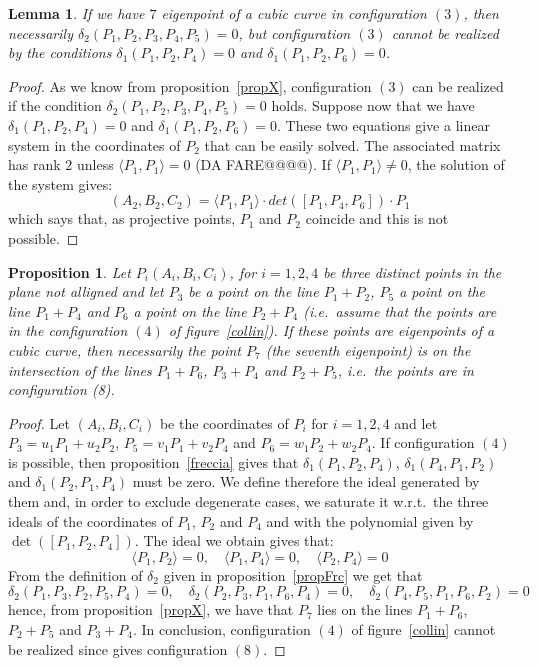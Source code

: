 \documentclass{amsart}
\theoremstyle{plain}
\newtheorem{prop}[theorem]{Proposition}
\newtheorem{lemma}[theorem]{Lemma}
\theoremstyle{definition}
\newcommand{\scl}[2]{\langle #1, #2 \rangle}
\begin{document}
\begin{lemma} If we have $7$ eigenpoint of a cubic curve in configuration
  $(3)$, then necessarily $\delta_2(P_1, P_2, P_3, P_4, P_5)=0$, but
  configuration $(3)$ cannot be realized by the conditions
  $\delta_1(P_1, P_2, P_4) = 0$ and
  $\delta_1(P_1, P_2, P_6)=0$.
\end{lemma}
\begin{proof}
As we know from proposition~\ref{propX}, configuration $(3)$ can be realized
if the condition $\delta_2(P_1, P_2, P_3, P_4, P_5) = 0$ holds.
Suppose now that we have
$\delta_1(P_1, P_2, P_4) = 0$ and  $\delta_1(P_1, P_2, P_6)=0$. These
two equations give a linear system in the coordinates of $P_2$ that can
be easily solved. The associated matrix has rank $2$ unless
$\scl{P_1}{P_1}=0$ (DA FARE@@@@). If $\scl{P_1}{P_1} \not = 0$,
the solution of the system gives:
\[
(A_2, B_2, C_2) = \scl{P_1}{P_1} \cdot det([P_1, P_4, P_6])\cdot P_1
\]
which says that, as projective points, $P_1$ and $P_2$ coincide and this is
not possible. 
\end{proof}

\begin{prop}
Let $P_i(A_i, B_i, C_i)$, for $i=1, 2, 4$
be three distinct points in the plane not alligned and let
$P_3$ be a point on the line $P_1+P_2$, $P_5$ a point on the line
$P_1+P_4$ and $P_6$ a point on the line $P_2+P_4$ (i.e.\ assume that
the points are in the configuration $(4)$ of figure~\ref{collin}).
If these points are eigenpoints of a cubic curve, then
necessarily the point $P_7$ (the seventh eigenpoint) is on the intersection
of the lines $P_1+P_6$, $P_3+P_4$ and $P_2+P_5$, i.e.\ the points are in
configuration (8).
\label{prp4}
\end{prop}
\begin{proof}
  Let $(A_i, B_i, C_i)$ be the coordinates of $P_i$ for $i=1, 2, 4$ and let
  $P_3 = u_1P_1+u_2P_2$, $P_5 = v_1P_1+v_2P_4$ and $P_6 = w_1P_2+w_2P_4$.
  If configuration $(4)$ is possible, then proposition~\ref{freccia} gives that
  $\delta_1(P_1, P_2, P_4)$,  $\delta_1(P_4, P_1, P_2)$ and
  $\delta_1(P_2, P_1, P_4)$ must be zero. We define therefore the ideal
  generated by them and, in order to exclude degenerate cases,
  we saturate it w.r.t.\ the three ideals of the
  coordinates of $P_1$, $P_2$ and $P_4$ and with the polynomial
  given by $\det([P_1, P_2, P_4])$. The ideal we obtain gives that:
  \[
  \scl{P_1}{P_2}=0, \quad \scl{P_1}{P_4}=0, \quad
  \scl{P_2}{P_4}=0
  \]
    {From} the definition of $\delta_2$ given in proposition~\ref{propFrc}
    we get that
\[
\delta_2(P_1, P_3, P_2, P_5, P_4) = 0, \quad
\delta_2(P_2, P_3, P_1, P_6, P_4) = 0, \quad
\delta_2(P_4, P_5, P_1, P_6, P_2) = 0
\]
hence, from proposition~\ref{propX}, we have that $P_7$ lies on the lines
$P_1+P_6$, $P_2+P_5$ and $P_3+P_4$. In conclusion, configuration $(4)$ of
figure~\ref{collin} cannot be realized since gives configuration $(8)$.
\end{proof}
\end{document}
